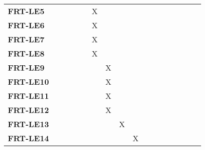 \documentclass[12pt, titlepage]{article}
\begin{document}
\begin{landscape}
\begin{longtable}{|l|cccccccccccc|}
		\textbf{FRT-LE5} & ~                                                         & ~             & ~             & X             & ~             & ~             & ~             & ~             & ~             & ~             & ~ &~\\
		\textbf{FRT-LE6} & ~                                                         & ~             & ~             & X             & ~             & ~             & ~             & ~             & ~             & ~             & ~ &~\\
		\textbf{FRT-LE7} & ~                                                         & ~             & ~             & X             & ~             & ~             & ~             & ~             & ~             & ~             & ~ &~\\
		\textbf{FRT-LE8} & ~                                                         & ~             & ~             & X             & ~             & ~             & ~             & ~             & ~             & ~             & ~ &~\\
		\textbf{FRT-LE9} & ~                                                         & ~             & ~             & ~             & X             & ~             & ~             & ~             & ~             & ~             & ~ &~\\
		\textbf{FRT-LE10} & ~                                                         & ~             & ~             & ~             & X             & ~             & ~             & ~             & ~             & ~             & ~ &~\\
		\textbf{FRT-LE11} & ~                                                         & ~             & ~             & ~             & X             & ~             & ~             & ~             & ~             & ~             & ~ &~\\
		\textbf{FRT-LE12} & ~                                                         & ~             & ~             & ~             & X             & ~             & ~             & ~             & ~             & ~             & ~ &~\\
		\textbf{FRT-LE13} & ~                                                         & ~             & ~             & ~             & ~             & X             & ~             & ~             & ~             & ~             & ~ &~\\
		\textbf{FRT-LE14} & ~                                                         & ~             & ~             & ~             & ~             & ~             & X             & ~             & ~             & ~             & ~ &~\\

\end{longtable}
\end{landscape}
\end{document}
